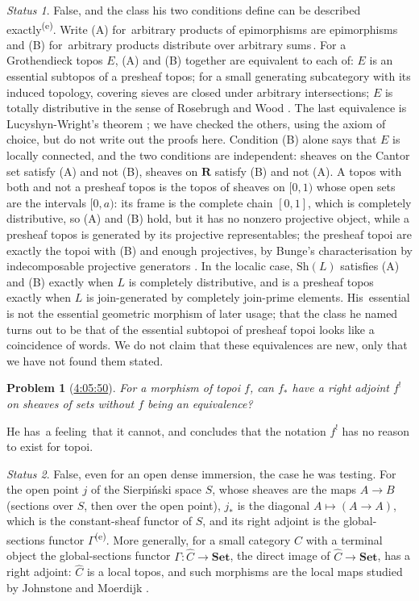 \documentclass[11pt,a4paper]{amsart}
\newtheorem{problem}{Problem}
\theoremstyle{definition}
\theoremstyle{remark}
\newtheorem*{status}{Status}
\newcommand{\q}[1]{\guillemotleft\,#1\,\guillemotright}
\newcommand{\ts}[3]{\href{https://www.youtube.com/watch?v=#1&t=#2}{#3}}
\newcommand{\Set}{\mathbf{Set}}
\newcommand{\own}{\textsuperscript{(e)}}
\begin{document}
\begin{status}
False, and the class his two conditions define can be described exactly\own. Write (A) for \q{arbitrary products of epimorphisms are epimorphisms} and (B) for \q{arbitrary products distribute over arbitrary sums}. For a Grothendieck topos $E$, (A) and (B) together are equivalent to each of: $E$ is an essential subtopos of a presheaf topos; for a small generating subcategory with its induced topology, covering sieves are closed under arbitrary intersections; $E$ is totally distributive in the sense of Rosebrugh and Wood \cite{rw}. The last equivalence is Lucyshyn-Wright's theorem \cite[1.5.5]{lw}; we have checked the others, using the axiom of choice, but do not write out the proofs here. Condition (B) alone says that $E$ is locally connected, and the two conditions are independent: sheaves on the Cantor set satisfy (A) and not (B), sheaves on $\mathbf R$ satisfy (B) and not (A). A topos with both and not a presheaf topos is the topos of sheaves on $[0,1)$ whose open sets are the intervals $[0,a)$: its frame is the complete chain $[0,1]$, which is completely distributive, so (A) and (B) hold, but it has no nonzero projective object, while a presheaf topos is generated by its projective representables; the presheaf topoi are exactly the topoi with (B) and enough projectives, by Bunge's characterisation by indecomposable projective generators \cite{bunge}. In the localic case, $\mathrm{Sh}(L)$ satisfies (A) and (B) exactly when $L$ is completely distributive, and is a presheaf topos exactly when $L$ is join-generated by completely join-prime elements. His \q{essential} is not the essential geometric morphism of later usage; that the class he named turns out to be that of the essential subtopoi of presheaf topoi looks like a coincidence of words. We do not claim that these equivalences are new, only that we have not found them stated.
\end{status}

\begin{problem}[\ts{PqCQM3Pcl6Q}{4h5m50s}{4:05:50}]\label{p:fshriek}
For a morphism of topoi $f$, can $f_*$ have a right adjoint $f^!$ on sheaves of sets without $f$ being an equivalence?
\end{problem}
He has \q{a feeling} that it cannot, and concludes that the notation $f^!$ has no reason to exist for topoi.

\begin{status}
False, even for an open dense immersion, the case he was testing. For the open point $j$ of the Sierpi\'nski space $S$, whose sheaves are the maps $A\to B$ (sections over $S$, then over the open point), $j_*$ is the diagonal $A\mapsto(A\to A)$, which is the constant-sheaf functor of $S$, and its right adjoint is the global-sections functor $\Gamma$\own. More generally, for a small category $C$ with a terminal object the global-sections functor $\Gamma\colon \widehat C\to\Set$, the direct image of $\widehat C\to\Set$, has a right adjoint: $\widehat C$ is a local topos, and such morphisms are the local maps studied by Johnstone and Moerdijk \cite{jm}.
\end{status}
\end{document}
